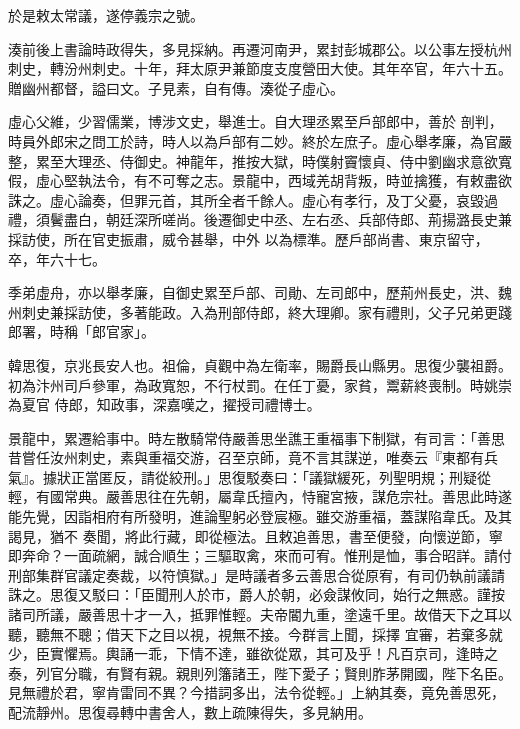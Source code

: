 \begin{pinyinscope}
 於是敕太常議，遂停義宗之號。



 湊前後上書論時政得失，多見採納。再遷河南尹，累封彭城郡公。以公事左授杭州刺史，轉汾州刺史。十年，拜太原尹兼節度支度營田大使。其年卒官，年六十五。贈幽州都督，謚曰文。子見素，自有傳。湊從子虛心。



 虛心父維，少習儒業，博涉文史，舉進士。自大理丞累至戶部郎中，善於
 剖判，時員外郎宋之問工於詩，時人以為戶部有二妙。終於左庶子。虛心舉孝廉，為官嚴整，累至大理丞、侍御史。神龍年，推按大獄，時僕射竇懷貞、侍中劉幽求意欲寬假，虛心堅執法令，有不可奪之志。景龍中，西域羌胡背叛，時並擒獲，有敕盡欲誅之。虛心論奏，但罪元首，其所全者千餘人。虛心有孝行，及丁父憂，哀毀過禮，須鬢盡白，朝廷深所嗟尚。後遷御史中丞、左右丞、兵部侍郎、荊揚潞長史兼採訪使，所在官吏振肅，威令甚舉，中外
 以為標準。歷戶部尚書、東京留守，卒，年六十七。



 季弟虛舟，亦以舉孝廉，自御史累至戶部、司勛、左司郎中，歷荊州長史，洪、魏州刺史兼採訪使，多著能政。入為刑部侍郎，終大理卿。家有禮則，父子兄弟更踐郎署，時稱「郎官家」。



 韓思復，京兆長安人也。祖倫，貞觀中為左衛率，賜爵長山縣男。思復少襲祖爵。初為汴州司戶參軍，為政寬恕，不行杖罰。在任丁憂，家貧，鬻薪終喪制。時姚崇為夏官
 侍郎，知政事，深嘉嘆之，擢授司禮博士。



 景龍中，累遷給事中。時左散騎常侍嚴善思坐譙王重福事下制獄，有司言：「善思昔嘗任汝州刺史，素與重福交游，召至京師，竟不言其謀逆，唯奏云『東都有兵氣』。據狀正當匿反，請從絞刑。」思復駁奏曰：「議獄緩死，列聖明規；刑疑從輕，有國常典。嚴善思往在先朝，屬韋氏擅內，恃寵宮掖，謀危宗社。善思此時遂能先覺，因詣相府有所發明，進論聖躬必登宸極。雖交游重福，蓋謀陷韋氏。及其謁見，猶不
 奏聞，將此行藏，即從極法。且敕追善思，書至便發，向懷逆節，寧即奔命？一面疏網，誠合順生；三驅取禽，來而可宥。惟刑是恤，事合昭詳。請付刑部集群官議定奏裁，以符慎獄。」是時議者多云善思合從原宥，有司仍執前議請誅之。思復又駁曰：「臣聞刑人於市，爵人於朝，必僉謀攸同，始行之無惑。謹按諸司所議，嚴善思十才一入，抵罪惟輕。夫帝閽九重，塗遠千里。故借天下之耳以聽，聽無不聰；借天下之目以視，視無不接。今群言上聞，採擇
 宜審，若棄多就少，臣實懼焉。輿誦一乖，下情不達，雖欲從眾，其可及乎！凡百京司，逢時之泰，列官分職，有賢有親。親則列籓諸王，陛下愛子；賢則胙茅開國，陛下名臣。見無禮於君，寧肯雷同不異？今措詞多出，法令從輕。」上納其奏，竟免善思死，配流靜州。思復尋轉中書舍人，數上疏陳得失，多見納用。




\end{pinyinscope}
